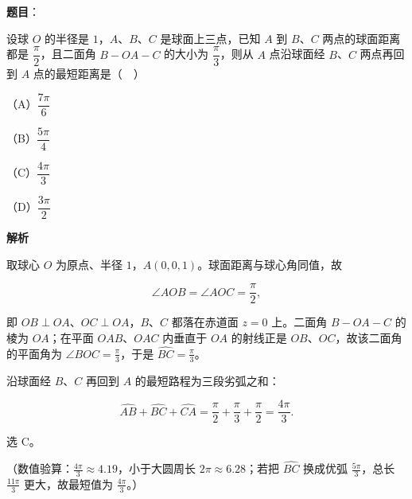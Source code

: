 \begin{answer}

\textbf{题目}：

设球 $O$ 的半径是 $1$，$A$、$B$、$C$ 是球面上三点，已知 $A$ 到 $B$、$C$ 两点的球面距离都是 $\dfrac{\pi}{2}$，且二面角 $B-OA-C$ 的大小为 $\dfrac{\pi}{3}$，则从 $A$ 点沿球面经 $B$、$C$ 两点再回到 $A$ 点的最短距离是（　）
\nopagebreak[4]
\begin{center}\end{center}
\nopagebreak[4]
（A）$\dfrac{7\pi}{6}$

（B）$\dfrac{5\pi}{4}$

（C）$\dfrac{4\pi}{3}$

（D）$\dfrac{3\pi}{2}$

\textbf{解析}

取球心 $O$ 为原点、半径 $1$，$A(0,0,1)$。球面距离与球心角同值，故

\nopagebreak[4]
\[\angle AOB=\angle AOC=\frac{\pi}{2},\]

即 $OB\perp OA$、$OC\perp OA$，$B$、$C$ 都落在赤道面 $z=0$ 上。二面角 $B-OA-C$ 的棱为 $OA$；在平面 $OAB$、$OAC$ 内垂直于 $OA$ 的射线正是 $OB$、$OC$，故该二面角的平面角为 $\angle BOC=\frac{\pi}{3}$，于是 $\widehat{BC}=\frac{\pi}{3}$。

沿球面经 $B$、$C$ 再回到 $A$ 的最短路程为三段劣弧之和：

\nopagebreak[4]
\[\widehat{AB}+\widehat{BC}+\widehat{CA}=\frac{\pi}{2}+\frac{\pi}{3}+\frac{\pi}{2}=\frac{4\pi}{3}.\]

选 C。

（数值验算：$\frac{4\pi}{3}\approx4.19$，小于大圆周长 $2\pi\approx6.28$；若把 $\widehat{BC}$ 换成优弧 $\frac{5\pi}{3}$，总长 $\frac{11\pi}{3}$ 更大，故最短值为 $\frac{4\pi}{3}$。）


\end{answer}
